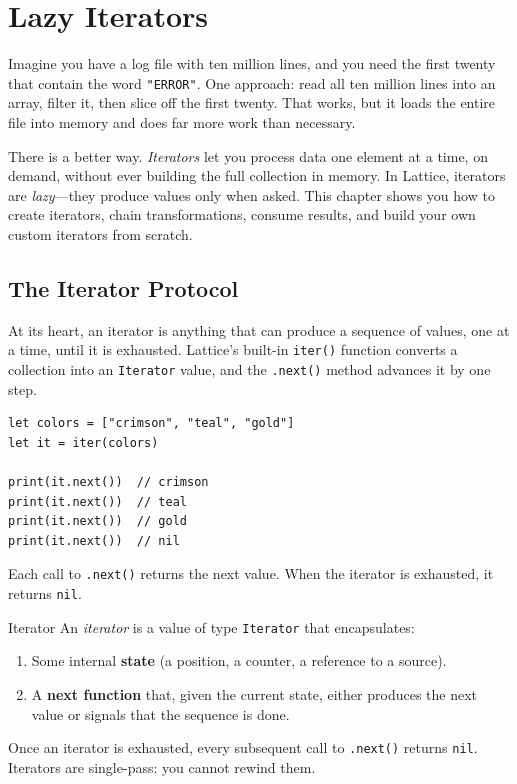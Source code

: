 \chapter{Lazy Iterators}\label{ch:lazy-iterators}


Imagine you have a log file with ten million lines, and you need the first twenty that contain the word \texttt{"ERROR"}.
One approach: read all ten million lines into an array, filter it, then slice off the first twenty.
That works, but it loads the entire file into memory and does far more work than necessary.

There is a better way.
\emph{Iterators} let you process data one element at a time, on demand, without ever building the full collection in memory.
In Lattice, iterators are \emph{lazy}---they produce values only when asked.
This chapter shows you how to create iterators, chain transformations, consume results, and build your own custom iterators from scratch.

\section{The Iterator Protocol}\label{sec:iterator-protocol}

At its heart, an iterator is anything that can produce a sequence of values, one at a time, until it is exhausted.
Lattice's built-in \lstinline|iter()| function converts a collection into an \lstinline|Iterator| value, and the \lstinline|.next()| method advances it by one step.

\begin{lstlisting}[language=Lattice, caption={The basic iterator protocol}]
let colors = ["crimson", "teal", "gold"]
let it = iter(colors)

print(it.next())  // crimson
print(it.next())  // teal
print(it.next())  // gold
print(it.next())  // nil
\end{lstlisting}

Each call to \lstinline|.next()| returns the next value.
When the iterator is exhausted, it returns \lstinline|nil|.

\begin{defnbox}{Iterator}
An \emph{iterator} is a value of type \lstinline|Iterator| that encapsulates:
\begin{enumerate}[nosep]
  \item Some internal \textbf{state} (a position, a counter, a reference to a source).
  \item A \textbf{next function} that, given the current state, either produces the next value or signals that the sequence is done.
\end{enumerate}
Once an iterator is exhausted, every subsequent call to \lstinline|.next()| returns \lstinline|nil|.
Iterators are single-pass: you cannot rewind them.
\end{defnbox}

